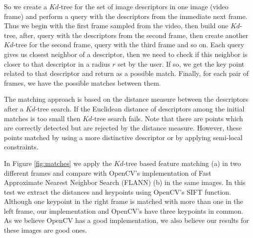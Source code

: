 \documentclass[]{IEEEtran}
\begin{document}
  So we create a $Kd$-tree for the set of image descriptors in one image (video frame) and perform a query with the descriptors from the immediate next frame. Thus we begin with the first frame sampled from the video, then build one $Kd$-tree, after, query with the descriptors from the second frame, then create another $Kd$-tree for the second frame, query with the third frame and so on. Each query gives us closest neighbor of a descriptor, then we need to check if this neighbor is closer to that descriptor in a radius $r$ set by the user. If so, we get the key point related to that descriptor and return as a possible match. Finally, for each pair of frames, we have the possible matches between them.

  The matching approach is based on the distance measure between the descriptors after a $Kd$-tree search. If the Euclidean distance of descriptors among the initial matches is too small then $Kd$-tree search fails. Note that there are points which are correctly detected but are rejected by the distance measure.  However, these points matched by using a more distinctive descriptor or by applying semi-local constraints\cite{sift_kdtree}.

  In Figure \ref{fig:matches} we apply the $Kd$-tree based feature matching (a) in two different frames and compare with OpenCV's implementation of Fast Approximate Nearest Neighbor Search (FLANN)\cite{flann} (b) in the same images. In this test we extract the distances and keypoints using OpenCV's SIFT function. Although one keypoint in the right frame is matched with more than one in the left frame, our implementation and OpenCV's have three keypoints in common. As we believe OpenCV has a good implementation, we also believe our results for these images are good ones.
\end{document}
